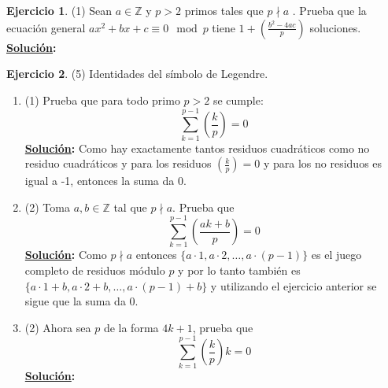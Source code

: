 \documentclass[11pt,letterpaper]{article}
\theoremstyle{definition}\newtheorem{p}{Ejercicio}
\newcommand{\Z}{\mathbb{Z}}
\newcommand{\leg}[2]{\left( \frac{#1}{#2}\right)} %
\newcommand{\sol}{\textbf{\underline{Solución}: }} %
\begin{document}
\begin{p}(1)
Sean $a\in\Z$ y $p>2$ primos tales que $p\nmid a$ . Prueba que la ecuaci\'on general
$ax^2+bx+c\equiv 0\mod p$ tiene $1+\left(\frac{b^2-4ac}{p}\right)$ soluciones.\\
\sol 

\end{p}


\begin{p}(5)
Identidades del s\'imbolo de Legendre.
\begin{enumerate}
  \item(1) Prueba que para todo primo $p>2$ se cumple:
  \[
    \sum_{k=1}^{p-1}\leg{k}{p}=0
  \]
  \sol Como hay exactamente tantos residuos cuadráticos como no residuo cuadráticos y para
  los residuos $\leg{k}{p}=0$ y para los no residuos es igual a -1, entonces la suma da 0.

  \item(2) Toma $a,b\in\Z$ tal que $p\nmid a$. Prueba que
  \[
    \sum_{k=1}^{p-1}\leg{ak+b}{p}=0
  \]
  \sol Como $p\nmid a$ entonces $\{ a \cdot 1, a \cdot 2, \ldots, a \cdot (p-1) \}$ es el juego
  completo de residuos módulo $p$ y por lo tanto también es
  $\{ a \cdot 1 + b, a \cdot 2+b, \ldots, a \cdot (p-1)+b \}$ y utilizando el ejercicio anterior
  se sigue que la suma da 0.

  \item(2) Ahora sea $p$ de la forma $4k+1$, prueba que
  \[
    \sum_{k=1}^{p-1}\leg{k}{p}k=0
  \]
  \sol

\end{enumerate}
\end{p}
\end{document}
